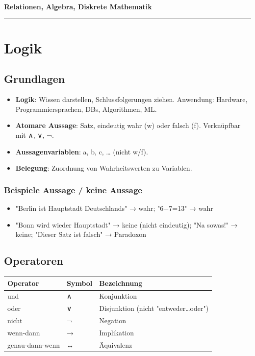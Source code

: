 \documentclass[11pt, a4paper]{article}
\providecommand{\nichttitle}{Lernzettel}
\renewcommand{\nichttitle}{Relationen, Algebra, Diskrete Mathematik}
\begin{document}
\begin{center}
{\bfseries\Large\color{accent}\nichttitle}\\[2pt]
\color{accent}\rule{0.35\linewidth}{1pt}\color{black}
\end{center}
\vspace{2pt}

{\small\tableofcontents}
\newpage


\section{Logik}


\subsection{Grundlagen}

\begin{itemize}
  \item \textbf{Logik}: Wissen darstellen, Schlussfolgerungen ziehen. Anwendung: Hardware, Programmiersprachen, DBs, Algorithmen, ML.
  \item \textbf{Atomare Aussage}: Satz, eindeutig wahr (w) oder falsch (f). Verknüpfbar mit ∧, ∨, ¬.
  \item \textbf{Aussagenvariablen}: a, b, c, … (nicht w/f).
  \item \textbf{Belegung}: Zuordnung von Wahrheitswerten zu Variablen.
\end{itemize}


\subsubsection{Beispiele Aussage / keine Aussage}
\begin{itemize}
  \item "Berlin ist Hauptstadt Deutschlands" → wahr; "6+7=13" → wahr
  \item "Bonn wird wieder Hauptstadt" → keine (nicht eindeutig); "Na sowas!" → keine; "Dieser Satz ist falsch" → Paradoxon
\end{itemize}


\subsection{Operatoren}


{\small
\begin{tabularx}{\linewidth}{XXX}
\hline
\rowcolor{tableheadbg}
{\color{white}\textbf{Operator}} & {\color{white}\textbf{Symbol}} & {\color{white}\textbf{Bezeichnung}} \\[2pt]
\hline
\endhead
\hline
\endfoot
und & ∧ & Konjunktion \\
oder & ∨ & Disjunktion (nicht "entweder…oder") \\
nicht & ¬ & Negation \\
wenn-dann & → & Implikation \\
genau-dann-wenn & ↔ & Äquivalenz \\
\end{tabularx}
}
\end{document}
